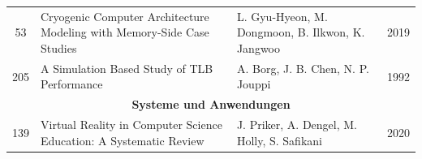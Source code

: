 {\begin{longtable}{|c|p{6cm}|p{3cm}|c|}
    \hline
    53 & Cryogenic Computer Architecture Modeling with Memory-Side Case Studies & L. Gyu-Hyeon, M. Dongmoon, B. Ilkwon, K. Jangwoo & 2019 \\
    205 & A Simulation Based Study of TLB Performance & A. Borg, J. B. Chen, N. P. Jouppi & 1992 \\
    \hline
    \multicolumn{4}{c}{\textbf{Systeme und Anwendungen}} \\
    \hline
    139 & Virtual Reality in Computer Science Education: A Systematic Review & J. Priker, A. Dengel, M. Holly, S. Safikani & 2020 \\
    \hline
\end{longtable}
}



